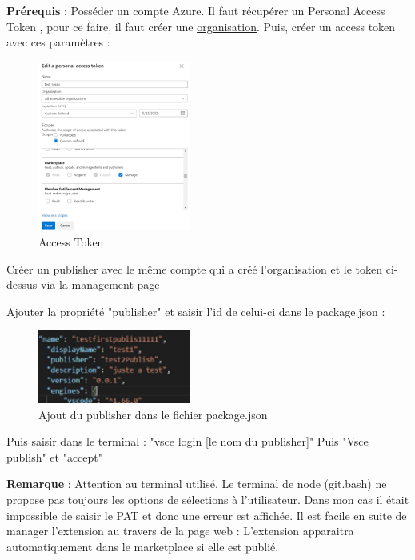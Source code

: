\documentclass[
    iict, %
    il, %
]{heig-tb}
\begin{document}
\textbf{Prérequis} : Posséder un compte Azure.
Il faut récupérer un Personal Access Token , pour ce faire, il faut créer une \href{https://docs.microsoft.com/en-us/azure/devops/organizations/accounts/create-organization?view=azure-devops}{organisation}.
Puis, créer un access token avec ces paramètres :
\begin{figure}[!ht]
    \begin{center}
        \includegraphics[width=5cm]{assets/figures/access-token.png}
    \end{center}
    \caption[Access Token]{\label{access-token}Access Token}
\end{figure}

Créer un publisher avec le même compte qui a créé l'organisation et le token ci-dessus via la \href{https://marketplace.visualstudio.com/manage/publishers/}{management page}

Ajouter la propriété "publisher" et saisir l'id de celui-ci dans le package.json :

\begin{figure}[!ht]
    \begin{center}
        \includegraphics[width=5cm]{assets/figures/json-publisher.png}
    \end{center}
    \caption[Ajout du publisher dans le fichier package.json]{\label{json-publisher} Ajout du publisher dans le fichier package.json}
\end{figure}

Puis saisir dans le terminal : "vsce login [le nom du publisher]"
Puis "Vsce publish" et "accept"

\textbf{Remarque} : Attention au terminal utilisé. Le terminal de node (git.bash) ne propose pas toujours les options de sélections à l'utilisateur. Dans mon cas il était impossible de saisir le PAT et donc une erreur est affichée.
Il est facile en suite de manager l'extension au travers de la page web :
L'extension apparaitra automatiquement dans le marketplace si elle est publié.
\end{document}
